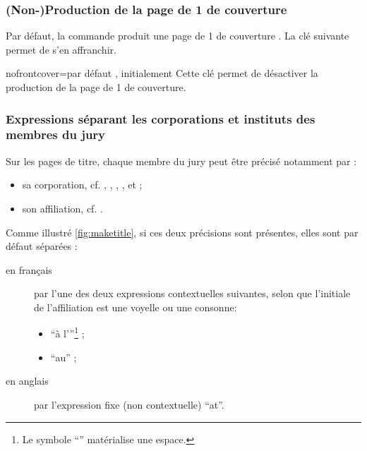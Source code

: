 \subsubsection{(Non-)Production de la page de 1\iere{} de
  couverture}\label{sec:non-production-de}

Par défaut, la commande  produit une page de 1\iere{} de
couverture . La clé
 suivante permet de s'en affranchir.

\begin{docKey}{nofrontcover}{=\textbar{}}{par défaut
    , initialement }
  Cette clé permet de désactiver la production de la page de 1\iere{} de
  couverture.
\end{docKey}

\subsubsection{Expressions séparant les corporations et instituts des membres
  du jury}
\label{sec:expr-separ-les}

Sur les pages de titre, chaque membre du jury peut être précisé notamment par :
\begin{itemize}
\item sa corporation, cf. , , ,
  ,  et
   ;
\item son affiliation, cf. .
\end{itemize}
Comme illustré \vref{fig:maketitle}, si ces deux précisions sont présentes,
elles sont par défaut séparées :
\begin{description}
\item[en français] par l'une des deux expressions contextuelles suivantes,
  selon que l'initiale de l'affiliation est une voyelle ou une consonne:
  \begin{itemize}
  \item \enquote{\textvisiblespace{}à l'}\footnote{Le symbole
      \enquote{\textvisiblespace{}} matérialise une espace.} ;
  \item \enquote{\textvisiblespace{}au\textvisiblespace{}} ;
  \end{itemize}
\item[en anglais] par l'expression fixe (non contextuelle)
  \enquote{\textvisiblespace{}at\textvisiblespace{}}.
\end{description}

